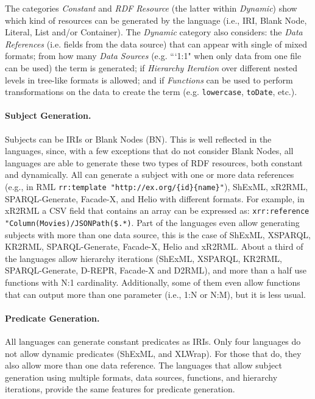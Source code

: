 The categories \textit{Constant} and \textit{RDF Resource} (the latter within \textit{Dynamic}) show which kind of resources can be generated by the language (i.e., IRI, Blank Node, Literal, List and/or Container). The \textit{Dynamic} category also considers: the \textit{Data References} (i.e. fields from the data source) that can appear with single of mixed formats; from how many \textit{Data Sources} (e.g. ```1:1" when only data from one file can be used) the term is generated; if \textit{Hierarchy Iteration} over different nested levels in tree-like formats is allowed; and if \textit{Functions} can be used to perform transformations on the data to create the term (e.g. \texttt{lowercase}, \texttt{toDate}, etc.).

\noindent\paragraph{\textbf{Subject Generation.}} Subjects can be IRIs or Blank Nodes (BN). This is well reflected in the languages, since, with a few exceptions that do not consider Blank Nodes, all languages are able to generate these two types of RDF resources, both constant and dynamically. All can generate a subject with one or more data references (e.g., in RML \texttt{rr:template "http://ex.org/\{id\}\-\{name\}"}), ShExML, xR2R\-ML, SPARQL-Generate, Facade-X, and Helio with different formats. For example, in xR2RML a CSV field that contains an array can be expressed as: \texttt{xrr:reference "Column(Mo\-vies)/JSONPath(\$.*)}. Part of the languages even allow generating subjects with more than one data source, this is the case of ShExML, XSPARQL, KR2RML, SPARQL-Generate, Facade-X, Helio and xR2RML. About a third of the languages allow hierarchy iterations (ShExML, XSPARQL, KR2RML, SPARQL-Generate, D-REPR, Facade-X and D2RML), and more than a half use functions with N:1 cardinality. Additionally, some of them even allow functions that can output more than one parameter (i.e., 1:N or N:M), but it is less usual.



\noindent\paragraph{\textbf{Predicate Generation.}} All languages can generate constant predicates as IRIs. Only four languages do not allow dynamic predicates (ShExML, and XLWrap). For those that do, they also allow more than one data reference. The languages that allow subject generation using multiple formats, data sources, functions, and hierarchy iterations, provide the same features for predicate generation.

